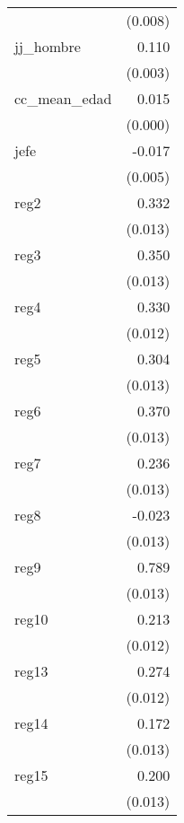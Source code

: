 {\begin{longtable}{l*{1}{D{.}{.}{-1}}}
            &     (0.008)         \\
\addlinespace
jj\_hombre   &       0.110\sym{***}\\
            &     (0.003)         \\
\addlinespace
cc\_mean\_edad&       0.015\sym{***}\\
            &     (0.000)         \\
\addlinespace
jefe        &      -0.017\sym{***}\\
            &     (0.005)         \\
\addlinespace
reg2        &       0.332\sym{***}\\
            &     (0.013)         \\
\addlinespace
reg3        &       0.350\sym{***}\\
            &     (0.013)         \\
\addlinespace
reg4        &       0.330\sym{***}\\
            &     (0.012)         \\
\addlinespace
reg5        &       0.304\sym{***}\\
            &     (0.013)         \\
\addlinespace
reg6        &       0.370\sym{***}\\
            &     (0.013)         \\
\addlinespace
reg7        &       0.236\sym{***}\\
            &     (0.013)         \\
\addlinespace
reg8        &      -0.023         \\
            &     (0.013)         \\
\addlinespace
reg9        &       0.789\sym{***}\\
            &     (0.013)         \\
\addlinespace
reg10       &       0.213\sym{***}\\
            &     (0.012)         \\
\addlinespace
reg13       &       0.274\sym{***}\\
            &     (0.012)         \\
\addlinespace
reg14       &       0.172\sym{***}\\
            &     (0.013)         \\
\addlinespace
reg15       &       0.200\sym{***}\\
            &     (0.013)         \\

\end{longtable}}
